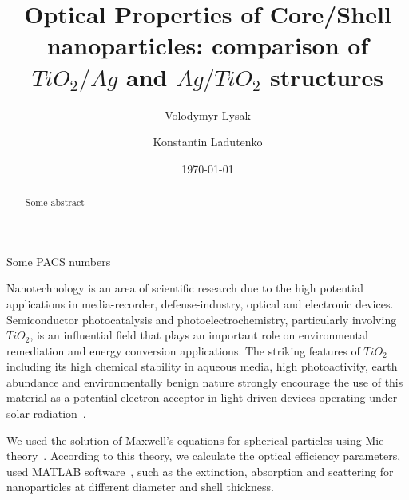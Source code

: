 \documentclass[aip,jap,reprint]{revtex4-1}
\begin{document}
\title{Optical Properties of Core/Shell nanoparticles: comparison of $TiO_{2}/Ag$  and
$Ag/TiO_{2}$ structures}
\author{Volodymyr Lysak}
\author{Konstantin Ladutenko}
\date{\today}
\begin{abstract}
  Some abstract
\end{abstract}

\pacs%
{ Some PACS numbers}
\maketitle %

Nanotechnology is an area of scientific research due to the high
potential applications in media-recorder, defense-industry, optical and
electronic devices. Semiconductor photocatalysis and
photoelectrochemistry, particularly involving $TiO_2$, is an influential
field that plays an important role on environmental remediation and
energy conversion applications. The striking features of $TiO_2$ including
its high chemical stability in aqueous media, high photoactivity, earth
abundance and environmentally benign nature strongly encourage the use
of this material as a potential electron acceptor in light driven
devices operating under solar radiation~\cite{Sudhagar-2015,
  Pelaez-2012, Lin-2006,Etacheri-2015}. 

We used the solution of Maxwell's equations for spherical particles
using Mie
theory~\cite{Mie-1908,Rivero-2013,Ghaforyan-2014,Bilankohi-2015,Ghaforyan-2015}.
According to this theory, we calculate the optical efficiency
parameters, used MATLAB software~\cite{Matzler-2002}, such as the extinction,
absorption and scattering for nanoparticles at different diameter and
shell thickness.
\end{document}
